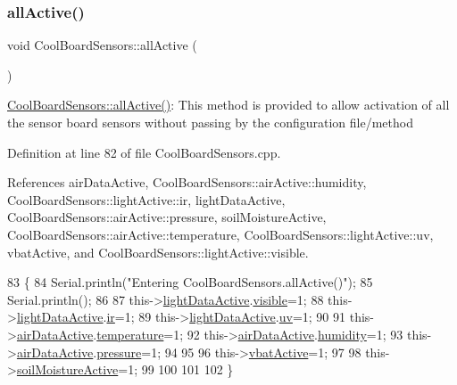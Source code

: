 \subsubsection{\texorpdfstring{all\+Active()}{allActive()}}
{\footnotesize\ttfamily void Cool\+Board\+Sensors\+::all\+Active (\begin{DoxyParamCaption}{ }\end{DoxyParamCaption})}

\hyperlink{classCoolBoardSensors_aa432c5aac88f89c31a10766390f23e0b}{Cool\+Board\+Sensors\+::all\+Active()}\+: This method is provided to allow activation of all the sensor board sensors without passing by the configuration file/method 

Definition at line 82 of file Cool\+Board\+Sensors.\+cpp.



References air\+Data\+Active, Cool\+Board\+Sensors\+::air\+Active\+::humidity, Cool\+Board\+Sensors\+::light\+Active\+::ir, light\+Data\+Active, Cool\+Board\+Sensors\+::air\+Active\+::pressure, soil\+Moisture\+Active, Cool\+Board\+Sensors\+::air\+Active\+::temperature, Cool\+Board\+Sensors\+::light\+Active\+::uv, vbat\+Active, and Cool\+Board\+Sensors\+::light\+Active\+::visible.


\begin{DoxyCode}
83 \{
84     Serial.println(\textcolor{stringliteral}{"Entering CoolBoardSensors.allActive()"});
85     Serial.println();
86     
87     this->\hyperlink{classCoolBoardSensors_ac4deb1cf41bac8b91c780c92fab00ba4}{lightDataActive}.\hyperlink{structCoolBoardSensors_1_1lightActive_abcbba296b6a95e67c0cd2555d9dd50c7}{visible}=1;
88     this->\hyperlink{classCoolBoardSensors_ac4deb1cf41bac8b91c780c92fab00ba4}{lightDataActive}.\hyperlink{structCoolBoardSensors_1_1lightActive_a67700895349b95ceb263f1a6da756315}{ir}=1;
89     this->\hyperlink{classCoolBoardSensors_ac4deb1cf41bac8b91c780c92fab00ba4}{lightDataActive}.\hyperlink{structCoolBoardSensors_1_1lightActive_a949a7aaf5166d981de8fe0fd93da20d6}{uv}=1;    
90 
91     this->\hyperlink{classCoolBoardSensors_abff8dfeccb2f7689847bb64d5f1cd31e}{airDataActive}.\hyperlink{structCoolBoardSensors_1_1airActive_a9a6633c426b0508e30ebc1832ec6d745}{temperature}=1;
92     this->\hyperlink{classCoolBoardSensors_abff8dfeccb2f7689847bb64d5f1cd31e}{airDataActive}.\hyperlink{structCoolBoardSensors_1_1airActive_ae5740445054b27415e22f450576accb7}{humidity}=1;
93     this->\hyperlink{classCoolBoardSensors_abff8dfeccb2f7689847bb64d5f1cd31e}{airDataActive}.\hyperlink{structCoolBoardSensors_1_1airActive_ab200826a70d1dc9945f5efb6b9c732ed}{pressure}=1;
94 
95 
96     this->\hyperlink{classCoolBoardSensors_af5039ad760b0ff0aa7eee16c55e81702}{vbatActive}=1;
97 
98     this->\hyperlink{classCoolBoardSensors_a31983eecc0f9cd000e1f912206ea4dc8}{soilMoistureActive}=1;
99     
100 
101 
102 \}
\end{DoxyCode}
\mbox{\label{classCoolBoardSensors_a97095823ef7c8f5290812f1405b966b3}} 
